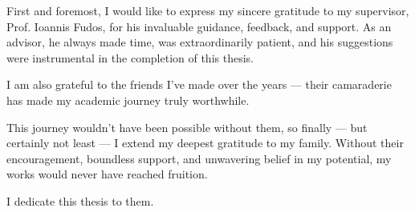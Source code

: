 First and foremost, I would like to express my sincere gratitude to my supervisor, Prof. Ioannis Fudos, for his invaluable guidance, feedback, and support. As an advisor, he always made time, was extraordinarily patient, and his suggestions were instrumental in the completion of this thesis.

I am also grateful to the friends I’ve made over the years — their camaraderie has made my academic journey truly worthwhile.

This journey wouldn't have been possible without them, so finally — but certainly not least — I extend my deepest gratitude to my family. Without their encouragement, boundless support, and unwavering belief in my potential, my works would never have reached fruition. \newline

I dedicate this thesis to them.